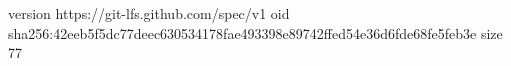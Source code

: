 version https://git-lfs.github.com/spec/v1
oid sha256:42eeb5f5dc77deec630534178fae493398e89742ffed54e36d6fde68fe5feb3e
size 77
